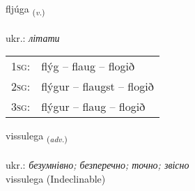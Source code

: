 \documentclass[frontgrid, backgrid]{flacards}\usepackage[]{graphicx}\usepackage[]{xcolor}
\begin{document}
\renewcommand{\flhead}{\vskip5pt \fboxsep=0pt {\small\bfseries\footnotesize Sagnorð | дієслово}}
\renewcommand{\fcfoot}{\vskip5pt \fboxsep=0pt \hspace{2pt}{\small\bfseries\footnotesize 1K}}

\renewcommand{\blhead}{\vskip5pt {\small\bfseries\footnotesize Sagnorð | дієслово }}
\renewcommand{\bcfoot}{\vskip5pt \hspace{2pt}{\small\bfseries\footnotesize 1K}}


{fljúga \small{\textsubscript{(\textit{v.})}} \\[1ex] %
\textphonetic{[fljuːɣa]} \\
ukr.: \emph{літати} \\  [2ex]
\renewcommand*{\arraystretch}{0.8}
\begin{tabular}{p{1cm}l}
\textsc{1sg}: & flýg -- flaug -- flogið \\ 
\textsc{2sg}: & flýgur -- flaugst -- flogið \\ 
\textsc{3sg}: & flýgur -- flaug -- flogið \\ 
\end{tabular}
}


\renewcommand{\flhead}{\vskip5pt \fboxsep=0pt {\small\bfseries\footnotesize Atviksorð | прислівник}}
\renewcommand{\fcfoot}{\vskip5pt \fboxsep=0pt \hspace{2pt}{\small\bfseries\footnotesize 1K}}

\renewcommand{\blhead}{\vskip5pt {\small\bfseries\footnotesize Atviksorð | прислівник }}
\renewcommand{\bcfoot}{\vskip5pt \hspace{2pt}{\small\bfseries\footnotesize 1K}}


{vissulega \small{\textsubscript{(\textit{adv.})}} \\[1ex]
\textphonetic{[vɪsʏlɛɣa]} \\
ukr.: \emph{безумнівно; безперечно; точно; звісно} \\  [2ex]
vissulega (Indeclinable)}
\end{document}
